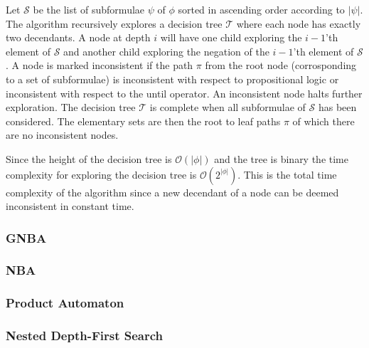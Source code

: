 Let $\mathcal{S}$ be the list of subformulae $\psi$ of $\phi$ sorted in ascending order according to $|\psi|$. The algorithm recursively explores a decision tree $\mathcal{T}$ where each node has exactly two decendants. A node at depth $i$ will have one child exploring the $i-1$'th element of $\mathcal{S}$ and another child exploring the negation of the $i-1$'th element of $\mathcal{S}$. A node is marked inconsistent if the path $\pi$ from the root node (corrosponding to a set of subformulae) is inconsistent with respect to propositional logic or inconsistent with respect to the until operator. An inconsistent node halts further exploration. The decision tree $\mathcal{T}$ is complete when all subformulae of $\mathcal{S}$ has been considered. The elementary sets are then the root to leaf paths $\pi$ of which there are no inconsistent nodes.

Since the height of the decision tree is $\mathcal{O}(|\phi|)$ and the tree is binary the time complexity for exploring the decision tree is $\mathcal{O}(2^{|\phi|})$. This is the total time complexity of the algorithm since a new decendant of a node can be deemed inconsistent in constant time.

\subsubsection{GNBA}

\subsubsection{NBA}

\subsubsection{Product Automaton}

\subsubsection{Nested Depth-First Search}
